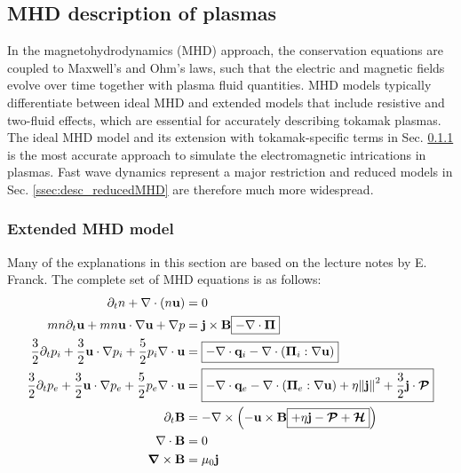 \subsection{MHD description of plasmas}
\label{sec:desc_MHD}
In the magnetohydrodynamics (MHD) approach, the conservation equations are coupled to Maxwell's and Ohm's laws, such that the electric and magnetic fields evolve over time together with plasma fluid quantities. MHD models typically differentiate between ideal MHD and extended models that include resistive and two-fluid effects, which are essential for accurately describing tokamak plasmas. The ideal MHD model and its extension with tokamak-specific terms in Sec. \ref{ssec:desc_extendedMHD} is the most accurate approach to simulate the electromagnetic intrications in plasmas. Fast wave dynamics represent a major restriction and reduced models in Sec. \ref{ssec:desc_reducedMHD} are therefore much more widespread. 

\subsubsection{Extended MHD model}
\label{ssec:desc_extendedMHD}
Many of the explanations in this section are based on the lecture notes by E. Franck\cite{lessig2016fluid}. The complete set of MHD equations is as follows:
\begin{align}
	\partial_t n + \nabla \cdot (n \mathbf{u}) &= 0 \label{eq:desc_MHDmass} \\
	mn\partial_t\mathbf{u} + mn\mathbf{u}\cdot\nabla\mathbf{u} + \nabla p &= \mathbf{j} \times \mathbf{B} \boxed{- \nabla \cdot \boldsymbol{\Pi}} \label{eq:desc_MHDmomentum} \\
	\frac{3}{2}\partial_t p_i + \frac{3}{2} \mathbf{u} \cdot \nabla p_i + \frac{5}{2}p_i \nabla \cdot \mathbf{u} &= \boxed{- \nabla \cdot \mathbf{q}_i - \nabla \cdot (\boldsymbol{\Pi}_i : \nabla \mathbf{u})} \label{eq:desc_MHDionpressure} \\
	\frac{3}{2}\partial_t p_e + \frac{3}{2} \mathbf{u} \cdot \nabla p_e + \frac{5}{2}p_e \nabla \cdot \mathbf{u}  &= \boxed{- \nabla \cdot \mathbf{q}_e - \nabla \cdot (\boldsymbol{\Pi}_e : \nabla \mathbf{u}) + \eta \norm{\mathbf{j}}^2 + \frac{3}{2}\mathbf{j}\cdot \bm{\mathcal{P}}} \label{eq:desc_MHDelectronpressure} \\
	\partial_t \mathbf{B} &= -\nabla \times \left(-\mathbf{u} \times \mathbf{B} \boxed{+ \eta \mathbf{j} - \bm{\mathcal{P}} + \bm{\mathcal{H}}}\right) \label{eq:desc_MHDohmlaw} \\
	\nabla \cdot \mathbf{B} &= 0 \label{eq:desc_MHDgausslaw} \\
	\grad \times \mathbf{B} &= \mu_0 \mathbf{j} \label{eq:desc_MHDamperelaw}
\end{align}

